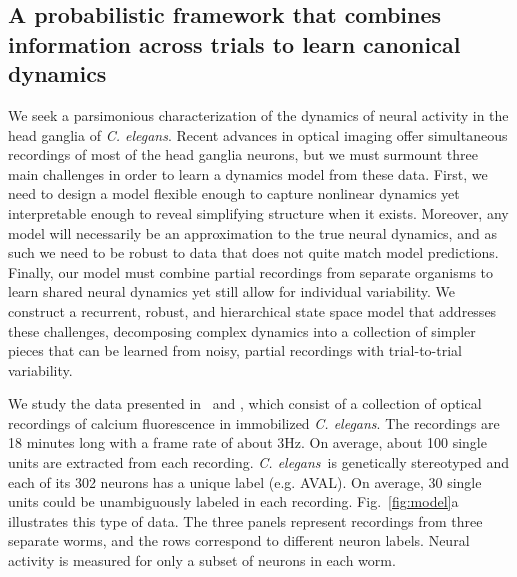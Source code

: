 \documentclass[11pt]{article}
\newcommand{\celegans}{\textit{C. elegans}}
\begin{document}
\subsection*{A probabilistic framework that combines information across
  trials to learn canonical dynamics}

We seek a parsimonious characterization of the dynamics of neural
activity in the head ganglia of \celegans. Recent advances in optical
imaging offer simultaneous recordings of most of the head ganglia
neurons, but we must surmount three main challenges in order to learn
a dynamics model from these data.  First, we need to design a model
flexible enough to capture nonlinear dynamics yet interpretable enough
to reveal simplifying structure when it exists.  Moreover, any model
will necessarily be an approximation to the true neural dynamics, and
as such we need to be robust to data that does not quite match model
predictions.  Finally, our model must combine partial recordings from
separate organisms to learn shared neural dynamics yet still allow for
individual variability. We construct a recurrent, robust, and
hierarchical state space model that addresses these challenges,
decomposing complex dynamics into a collection of simpler pieces that
can be learned from noisy, partial recordings with trial-to-trial
variability.

We study the data presented in~\citet{kato2015global} and
\citet{nichols2017global}, which consist of a collection of optical
recordings of calcium fluorescence in immobilized \celegans. The
recordings are 18 minutes long with a frame rate of about 3Hz.  On
average, about 100 single units are extracted from each
recording. \celegans~is genetically stereotyped and each of its 302
neurons has a unique label (e.g. \textsf{AVAL}). On average, 30 single
units could be unambiguously labeled in each
recording. Fig.~\ref{fig:model}a illustrates this type of data. The
three panels represent recordings from three separate worms, and the
rows correspond to different neuron labels.  Neural activity is
measured for only a subset of neurons in each worm.
\end{document}

